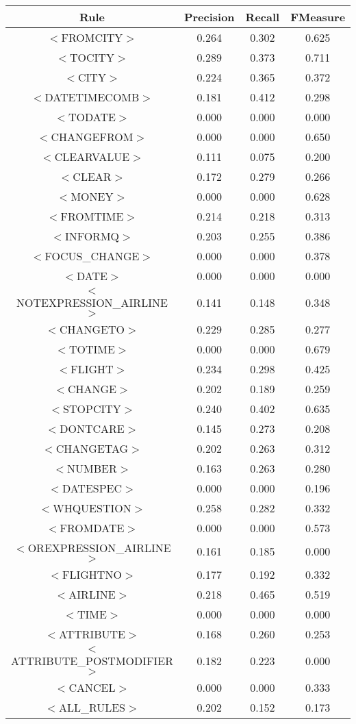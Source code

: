 \documentclass[a4paper,10pt]{article}
\begin{document}
\begin{center}
\begin{tabular}{|c||c|c|c|}
\hline
Rule&Precision&Recall&FMeasure\\
\hline
\hline
$<$FROMCITY$>$&0.264&0.302&0.625 \\
\hline$<$TOCITY$>$&0.289&0.373&0.711 \\
\hline$<$CITY$>$&0.224&0.365&0.372 \\
\hline$<$DATETIMECOMB$>$&0.181&0.412&0.298 \\
\hline$<$TODATE$>$&0.000&0.000&0.000 \\
\hline$<$CHANGEFROM$>$&0.000&0.000&0.650 \\
\hline$<$CLEARVALUE$>$&0.111&0.075&0.200 \\
\hline$<$CLEAR$>$&0.172&0.279&0.266 \\
\hline$<$MONEY$>$&0.000&0.000&0.628 \\
\hline$<$FROMTIME$>$&0.214&0.218&0.313 \\
\hline$<$INFORMQ$>$&0.203&0.255&0.386 \\
\hline$<$FOCUS\_CHANGE$>$&0.000&0.000&0.378 \\
\hline$<$DATE$>$&0.000&0.000&0.000 \\
\hline$<$NOTEXPRESSION\_AIRLINE$>$&0.141&0.148&0.348 \\
\hline$<$CHANGETO$>$&0.229&0.285&0.277 \\
\hline$<$TOTIME$>$&0.000&0.000&0.679 \\
\hline$<$FLIGHT$>$&0.234&0.298&0.425 \\
\hline$<$CHANGE$>$&0.202&0.189&0.259 \\
\hline$<$STOPCITY$>$&0.240&0.402&0.635 \\
\hline$<$DONTCARE$>$&0.145&0.273&0.208 \\
\hline$<$CHANGETAG$>$&0.202&0.263&0.312 \\
\hline$<$NUMBER$>$&0.163&0.263&0.280 \\
\hline$<$DATESPEC$>$&0.000&0.000&0.196 \\
\hline$<$WHQUESTION$>$&0.258&0.282&0.332 \\
\hline$<$FROMDATE$>$&0.000&0.000&0.573 \\
\hline$<$OREXPRESSION\_AIRLINE$>$&0.161&0.185&0.000 \\
\hline$<$FLIGHTNO$>$&0.177&0.192&0.332 \\
\hline$<$AIRLINE$>$&0.218&0.465&0.519 \\
\hline$<$TIME$>$&0.000&0.000&0.000 \\
\hline$<$ATTRIBUTE$>$&0.168&0.260&0.253 \\
\hline$<$ATTRIBUTE\_POSTMODIFIER$>$&0.182&0.223&0.000 \\
\hline$<$CANCEL$>$&0.000&0.000&0.333 \\
\hline
\hline
$<$ALL\_RULES$>$&0.202&0.152&0.173 \\
\hline
\end{tabular}
\end{center}
\pagebreak
\end{document}

